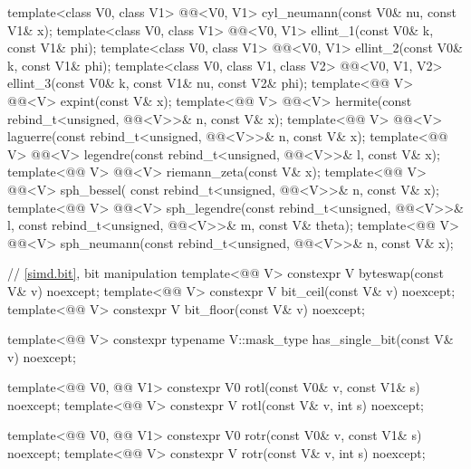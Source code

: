 \begin{codeblock}
{  template<class V0, class V1>
    @@<V0, V1> cyl_neumann(const V0& nu, const V1& x);
  template<class V0, class V1>
    @@<V0, V1> ellint_1(const V0& k, const V1& phi);
  template<class V0, class V1>
    @@<V0, V1> ellint_2(const V0& k, const V1& phi);
  template<class V0, class V1, class V2>
    @@<V0, V1, V2> ellint_3(const V0& k, const V1& nu, const V2& phi);
  template<@@ V> @@<V> expint(const V& x);
  template<@@ V>
    @@<V> hermite(const rebind_t<unsigned, @@<V>>& n, const V& x);
  template<@@ V>
    @@<V> laguerre(const rebind_t<unsigned, @@<V>>& n, const V& x);
  template<@@ V>
    @@<V> legendre(const rebind_t<unsigned, @@<V>>& l, const V& x);
  template<@@ V>
    @@<V> riemann_zeta(const V& x);
  template<@@ V>
    @@<V> sph_bessel(
      const rebind_t<unsigned, @@<V>>& n, const V& x);
  template<@@ V>
    @@<V> sph_legendre(const rebind_t<unsigned, @@<V>>& l,
      const rebind_t<unsigned, @@<V>>& m, const V& theta);
  template<@@ V>
    @@<V>
      sph_neumann(const rebind_t<unsigned, @@<V>>& n, const V& x);

  // \ref{simd.bit}, bit manipulation
  template<@@ V> constexpr V byteswap(const V& v) noexcept;
  template<@@ V> constexpr V bit_ceil(const V& v) noexcept;
  template<@@ V> constexpr V bit_floor(const V& v) noexcept;

  template<@@ V>
    constexpr typename V::mask_type has_single_bit(const V& v) noexcept;

  template<@@ V0, @@ V1>
    constexpr V0 rotl(const V0& v, const V1& s) noexcept;
  template<@@ V>
    constexpr V  rotl(const V& v, int s) noexcept;

  template<@@ V0, @@ V1>
    constexpr V0 rotr(const V0& v, const V1& s) noexcept;
  template<@@ V>
    constexpr V  rotr(const V& v, int s) noexcept;

}
\end{codeblock}
